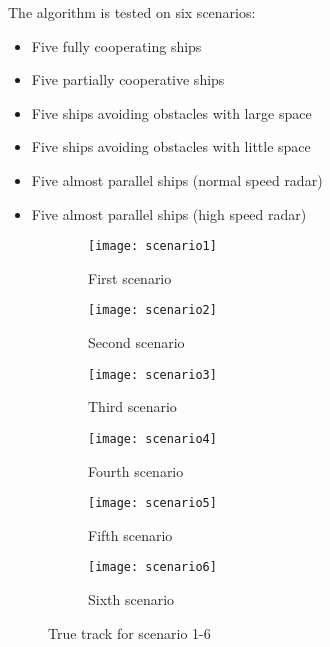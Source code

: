 The algorithm is tested on six scenarios:
\begin{itemize}
	\item Five fully cooperating ships
    \item Five partially cooperative ships
    \item Five ships avoiding obstacles with large space
    \item Five ships avoiding obstacles with little space
	\item Five almost parallel ships (normal speed \gls{radar})
	\item Five almost parallel ships (high speed \gls{radar})
\end{itemize}
\begin{figure}[H]
    \centering
    \begin{subfigure}{0.45\textwidth}
        \centering
        \texttt{[image: scenario1]}
        \caption{First scenario}
    \end{subfigure}
    \begin{subfigure}{0.45\textwidth}
        \centering
        \texttt{[image: scenario2]}
        \caption{Second scenario}
    \end{subfigure}
    \begin{subfigure}{0.45\textwidth}
        \centering
        \texttt{[image: scenario3]}
        \caption{Third scenario}
    \end{subfigure}
    \begin{subfigure}{0.45\textwidth}
        \centering
        \texttt{[image: scenario4]}
        \caption{Fourth scenario}
    \end{subfigure}
    \begin{subfigure}{0.45\textwidth}
        \centering
        \texttt{[image: scenario5]}
        \caption{Fifth scenario}
    \end{subfigure}
    \begin{subfigure}{0.45\textwidth}
        \centering
        \texttt{[image: scenario6]}
        \caption{Sixth scenario}
    \end{subfigure}
    \caption{True track for scenario 1-6}
    \label{fig:true_tracks}
\end{figure} 


